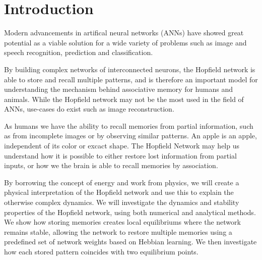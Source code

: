 \section{Introduction}
Modern advancements in artifical neural networks (ANNs) have showed great potential as a viable solution for a wide variety of problems such as image and speech recognition, prediction and classification. 

By building complex networks of interconnected neurons, the Hopfield network is able to store and recall multiple patterns, and is therefore an important model for understanding the mechanism behind associative memory for humans and animals. While the Hopfield network may not be the most used in the field of ANNs, use-cases do exist such as image reconstruction. 

As humans we have the ability to recall memories from partial information, such as from incomplete images or by observing similar patterns. An apple is an apple, independent of its color or excact shape. The Hopfield Network may help us understand how it is possible to either restore lost information from partial inputs, or how we the brain is able to recall memories by association.

By borrowing the concept of energy and work from physics, we will create a physical interpretation of the Hopfield network and use this to explain the otherwise complex dynamics. We will investigate the dynamics and stability properties of the Hopfield network, using both numerical and analytical methods. We show how storing memories creates local equilibriums where the network remains stable, allowing the network to restore multiple memories using a predefined set of network weights based on Hebbian learning. We then investigate how each stored pattern coincides with two equilibrium points.